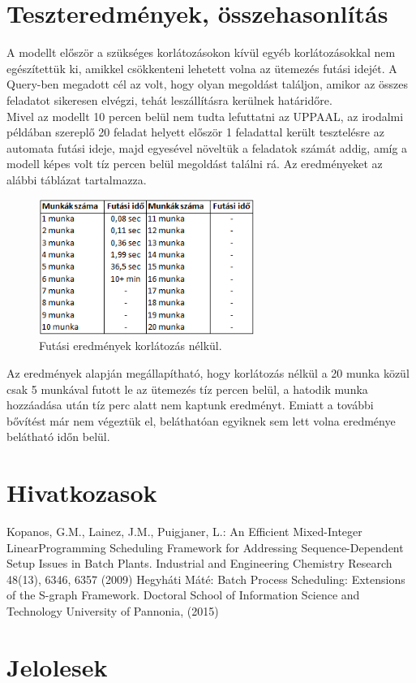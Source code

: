 \documentclass {report}
\begin{document}
\chapter{Teszteredmények, összehasonlítás}
A modellt először a szükséges korlátozásokon kívül egyéb korlátozásokkal nem egészítettük ki, amikkel csökkenteni lehetett volna az ütemezés futási idejét. A Query-ben megadott cél az volt, hogy olyan megoldást találjon, amikor az összes feladatot sikeresen elvégzi, tehát leszállításra kerülnek határidőre.\\
Mivel az modellt 10 percen belül nem tudta lefuttatni az UPPAAL, az irodalmi példában szereplő 20 feladat helyett először 1 feladattal került tesztelésre az automata futási ideje, majd egyesével növeltük a feladatok számát addig, amíg a modell képes volt tíz percen belül megoldást találni rá. Az eredményeket az alábbi táblázat tartalmazza.
\begin{figure}[htpb]
\begin{center}
\includegraphics[height=4.4cm]{tablazat_2}
\caption{Futási eredmények korlátozás nélkül.}
\end{center}
\end{figure}

Az eredmények alapján megállapítható, hogy korlátozás nélkül a 20 munka közül csak 5 munkával futott le az ütemezés tíz percen belül, a hatodik munka hozzáadása után tíz perc alatt nem kaptunk eredményt. Emiatt a további bővítést már nem végeztük el, beláthatóan egyiknek sem lett volna eredménye belátható időn belül.





\chapter*{Hivatkozasok}
\begin{thebibliography}{99}
\bibitem Kopanos, G.M., Lainez, J.M., Puigjaner, L.: An Efficient Mixed-Integer LinearProgramming Scheduling Framework for Addressing Sequence-Dependent Setup Issues in Batch Plants. Industrial and Engineering Chemistry Research 48(13), 6346, 6357 (2009)
\bibitem Hegyháti Máté: Batch Process Scheduling: Extensions of the S-graph Framework. Doctoral School of Information Science and Technology University of Pannonia, (2015)
\end{thebibliography}

\appendix

\chapter{Jelolesek}
\end{document}
